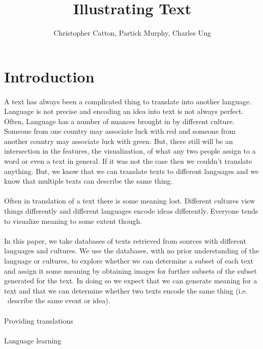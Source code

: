 \documentclass[12pt]{article}
\title{Illustrating Text}
\author{Christopher Catton, Partick Murphy, Charles Ung}
\begin{document}
\section{Introduction}
\paragraph{}
A text has always been a complicated thing to translate into another language. Language
is not precise and encoding an idea into text is not always perfect. Often, Language 
has a number of nuances brought in by different culture. Someone from one country may
associate luck with red and someone from another country may associate luck with green.
But, there still will be an intersection in the features, the visualization, of what
any two people assign to a word or even a text in general. If it was not the case then
we couldn't translate anything. But, we know that we can translate texts to different
languages and we know that multiple texts can describe the same thing.
\paragraph{}
Often in translation of a text there is some meaning lost. Different cultures view things
differently and different languages encode ideas differently. Everyone tends to visualize 
meaning to some extent though.

\paragraph{}
In this paper, we take databases of texts retrieved from sources with different languages and
cultures. We use the databases, with no prior understanding of the language or cultures, to
explore whether we can determine a subset of each text and assign it some meaning by obtaining
images for further subsets of the subset generated for the text. In doing so we expect that
we can generate meaning for a text and that we can determine whether two texts encode the
same thing (i.e. \ describe the same event or idea).

\paragraph{}
Providing translations
\paragraph{}
Language learning
\end{document}
